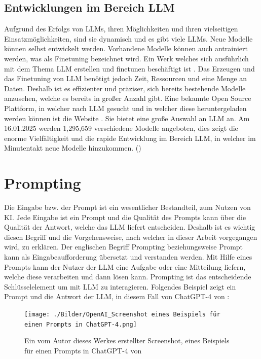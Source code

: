 \documentclass[12pt,toc=bib,toc=listof]{scrreprt}
\begin{document}
\subsection{Entwicklungen im Bereich LLM} %
\label{sec:entwicklungenImBereichLLM}
Aufgrund des Erfolgs von LLMs, ihren Möglichkeiten und ihren vielseitigen Einsatzmöglichkeiten, sind sie dynamisch und es gibt viele LLMs. Neue Modelle können selbst entwickelt werden. Vorhandene Modelle können auch antrainiert werden, was als Finetuning bezeichnet wird. Ein Werk welches sich ausführlich mit dem Thema LLM erstellen und finetunen beschäftigt ist \textcite{Géron2019}. Das Erzeugen und das Finetuning von LLM benötigt jedoch Zeit, Ressourcen und eine Menge an Daten. Deshalb ist es effizienter und präziser, sich bereits bestehende Modelle anzusehen, welche es bereits in großer Anzahl gibt. Eine bekannte Open Source Plattform, in welcher nach LLM gesucht und in welcher diese heruntergeladen werden können ist die Website \textcite{HuggingFace2025}. Sie bietet eine große Auswahl an LLM an. Am 16.01.2025 werden 1,295,659 verschiedene Modelle angeboten, dies zeigt die enorme Vielfältigkeit und die rapide Entwicklung im Bereich LLM, in welcher im Minutentakt neue Modelle hinzukommen. (\cite{Géron2019})\\

\section{Prompting} %
\label{sec:prompting}
Die Eingabe bzw. der Prompt ist ein wesentlicher Bestandteil, zum Nutzen von KI. Jede Eingabe ist ein Prompt und die Qualität des Prompts kann über die Qualität der Antwort, welche das LLM liefert entscheiden. Deshalb ist es wichtig diesen Begriff und die Vorgehensweise, nach welcher in dieser Arbeit vorgegangen wird, zu erklären. Der englischen Begriff Prompting beziehungsweise Prompt kann als Eingabeaufforderung übersetzt und verstanden werden. Mit Hilfe eines Prompts kann der Nutzer der LLM eine Aufgabe oder eine Mitteilung liefern, welche diese verarbeiten und dann lösen kann. Prompting ist das entscheidende Schlüsselelement um mit LLM zu interagieren. Folgendes Beispiel zeigt ein Prompt und die Antwort der LLM, in diesem Fall von ChatGPT-4 von \textcite{OpenAI2025}:

\begin{figure} [H]
    \centering
    \texttt{[image: ./Bilder/OpenAI\_Screenshot eines Beispiels für einen Prompts in ChatGPT-4.png]}
    \caption{Ein vom Autor dieses Werkes erstellter Screenshot, eines Beispiels für einen Prompts in ChatGPT-4 von \textcite{OpenAI2025}}
    \label{fig:enter-label}
\end{figure}
\end{document}
